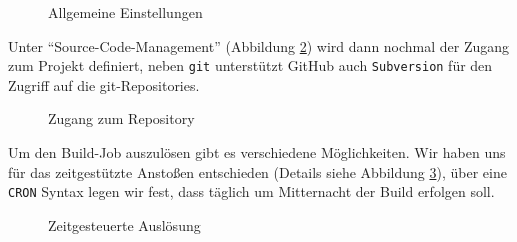 \begin{figure}
\caption{Allgemeine Einstellungen}\label{fig:jcommon}
\end{figure}

Unter \enquote{Source-Code-Management} (Abbildung \ref{fig:jgit}) wird dann nochmal der Zugang zum Projekt definiert, neben \texttt{git} unterstützt GitHub auch \texttt{Subversion} für den Zugriff auf die git-Repositories.


\begin{figure}
\caption{Zugang zum Repository}\label{fig:jgit}
\end{figure}

Um den Build-Job auszulösen gibt es verschiedene Möglichkeiten. Wir haben uns für das zeitgestützte Anstoßen entschieden (Details siehe Abbildung \ref{fig:jcron}), über eine \texttt{CRON} Syntax legen wir fest, dass täglich um Mitternacht der Build erfolgen soll. 


\begin{figure}
\caption{Zeitgesteuerte Auslösung}\label{fig:jcron}
\end{figure}


